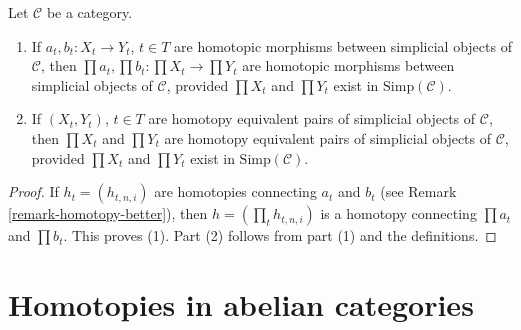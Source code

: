 \begin{lemma}
\label{lemma-products-homotopy}
Let $\mathcal{C}$ be a category.
\begin{enumerate}
\item If $a_t, b_t : X_t \to Y_t$, $t \in T$ are homotopic morphisms
between simplicial objects of $\mathcal{C}$, then
$\prod a_t, \prod b_t : \prod X_t \to \prod Y_t$ are homotopic morphisms
between simplicial objects of $\mathcal{C}$, provided $\prod X_t$
and $\prod Y_t$ exist in $\text{Simp}(\mathcal{C})$.
\item If $(X_t, Y_t)$, $t \in T$ are homotopy equivalent pairs of
simplicial objects of $\mathcal{C}$, then $\prod X_t$ and $\prod Y_t$
are homotopy equivalent pairs of simplicial objects of $\mathcal{C}$,
provided $\prod X_t$ and $\prod Y_t$ exist in $\text{Simp}(\mathcal{C})$.
\end{enumerate}
\end{lemma}

\begin{proof}
If $h_t = (h_{t, n , i})$ are homotopies connecting $a_t$ and $b_t$
(see Remark \ref{remark-homotopy-better}), then
$h = (\prod_t h_{t, n, i})$ is a homotopy
connecting $\prod a_t$ and $\prod b_t$. This proves (1).
Part (2) follows from part (1) and the definitions.
\end{proof}


\section{Homotopies in abelian categories}
\label{section-homotopy-abelian}

